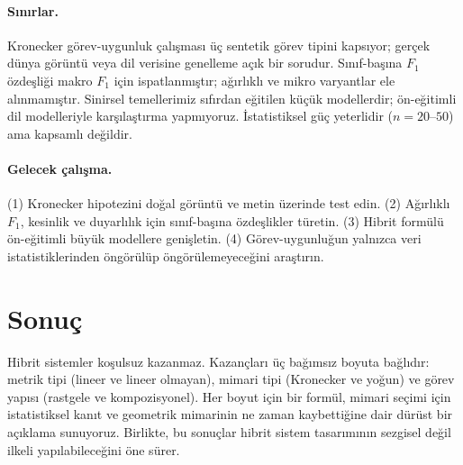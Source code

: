 \documentclass[11pt,a4paper]{article}
\begin{document}
\paragraph{Sınırlar.}
Kronecker görev-uygunluk çalışması üç sentetik görev tipini kapsıyor;
gerçek dünya görüntü veya dil verisine genelleme açık bir sorudur.
Sınıf-başına $F_1$ özdeşliği makro $F_1$ için ispatlanmıştır; ağırlıklı
ve mikro varyantlar ele alınmamıştır. Sinirsel temellerimiz sıfırdan
eğitilen küçük modellerdir; ön-eğitimli dil modelleriyle karşılaştırma
yapmıyoruz. İstatistiksel güç yeterlidir ($n = 20$--$50$) ama kapsamlı
değildir.

\paragraph{Gelecek çalışma.}
(1) Kronecker hipotezini doğal görüntü ve metin üzerinde test edin.
(2) Ağırlıklı $F_1$, kesinlik ve duyarlılık için sınıf-başına özdeşlikler
türetin. (3) Hibrit formülü ön-eğitimli büyük modellere genişletin.
(4) Görev-uygunluğun yalnızca veri istatistiklerinden öngörülüp
öngörülemeyeceğini araştırın.

\section{Sonuç}
\label{sec:conclusion}

Hibrit sistemler koşulsuz kazanmaz. Kazançları üç bağımsız boyuta
bağlıdır: metrik tipi (lineer ve lineer olmayan), mimari tipi (Kronecker
ve yoğun) ve görev yapısı (rastgele ve kompozisyonel). Her boyut için
bir formül, mimari seçimi için istatistiksel kanıt ve geometrik
mimarinin ne zaman kaybettiğine dair dürüst bir açıklama sunuyoruz.
Birlikte, bu sonuçlar hibrit sistem tasarımının sezgisel değil ilkeli
yapılabileceğini öne sürer.
\end{document}
